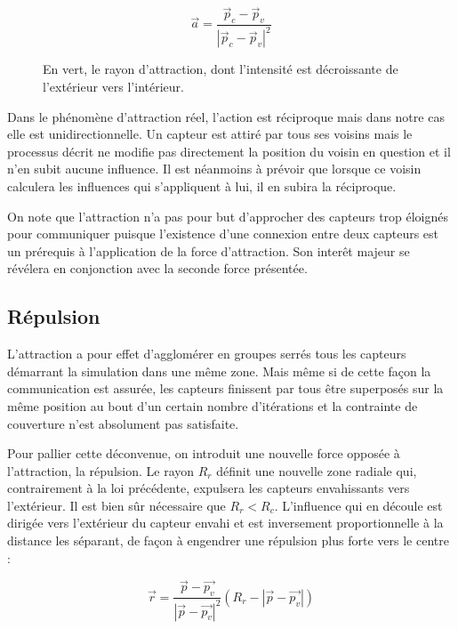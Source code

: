 \documentclass[10pt]{article}
\begin{document}
\begin{multicols}{2}
$$
\vec{a} = \frac{\vec{p}_c - \vec{p}_v}{|\vec{p}_c - \vec{p}_v|^2}
$$

\begin{figure}[H]

  \centering

  

  \caption{En vert, le rayon d'attraction, dont l'intensité est
    décroissante de l'extérieur vers l'intérieur.}
  \label{attraction}

\end{figure}

Dans le phénomène d'attraction réel, l'action est réciproque mais dans
notre cas elle est unidirectionnelle. Un capteur est attiré par tous
ses voisins mais le processus décrit ne modifie pas directement la
position du voisin en question et il n'en subit aucune influence. Il
est néanmoins à prévoir que lorsque ce voisin calculera les influences
qui s'appliquent à lui, il en subira la réciproque.

On note que l'attraction n'a pas pour but d'approcher des capteurs
trop éloignés pour communiquer puisque l'existence d'une connexion
entre deux capteurs est un prérequis à l'application de la force
d'attraction. Son interêt majeur se révélera en conjonction avec la
seconde force présentée.

\subsection*{Répulsion}

L'attraction a pour effet d'agglomérer en groupes serrés tous les
capteurs démarrant la simulation dans une même zone. Mais même si de
cette façon la communication est assurée, les capteurs finissent par
tous être superposés sur la même position au bout d'un certain nombre
d'itérations et la contrainte de couverture n'est absolument pas
satisfaite.

Pour pallier cette déconvenue, on introduit une nouvelle force opposée
à l'attraction, la répulsion. Le rayon $R_r$ définit une nouvelle zone
radiale qui, contrairement à la loi précédente, expulsera les capteurs
envahissants vers l'extérieur. Il est bien sûr nécessaire que $R_r <
R_c$. L'influence qui en découle est dirigée vers l'extérieur du
capteur envahi et est inversement proportionnelle à la distance les
séparant, de façon à engendrer une répulsion plus forte vers le centre
\cite{Cheng2011497} :

$$
\vec{r} = \frac{\vec{p} - \vec{p_v}}{|\vec{p} - \vec{p_v}|^2}(R_r - |\vec{p} - \vec{p_v}|)
$$


\end{multicols}
\end{document}
